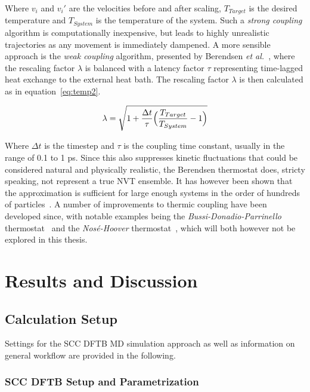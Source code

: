 \documentclass[11pt]{article}
\begin{document}
\bigskip

\noindent Where $v_i$ and $v_i'$ are the velocities before and after scaling, $T_{Target}$ is the desired temperature and $T_{System}$ is the temperature of the system. Such a \textit{strong coupling} algorithm is computationally inexpensive, but leads to highly unrealistic trajectories as any movement is immediately dampened. A more sensible approach is the \textit{weak coupling} algorithm, presented by Berendsen \textit{et al.}~\cite{Berendsen1984}, where the rescaling factor $\lambda$ is balanced with a latency factor $\tau$ representing time-lagged heat exchange to the external heat bath. The rescaling factor $\lambda$ is then calculated as in equation~\ref{eq:temp2}.

\begin{equation}
  \lambda = \sqrt{1 + \frac{\Delta t}{\tau}\Bigl(\frac{T_{Target}}{T_{System}} - 1\Bigr)}
  \label{eq:temp2}
\end{equation}

\bigskip

\noindent Where $\Delta t$ is the timestep and $\tau$ is the coupling time constant, usually in the range of 0.1 to 1 ps. Since this also suppresses kinetic fluctuations that could be considered natural and physically realistic, the Berendsen thermostat does, stricty speaking, not represent a true NVT ensemble. It has however been shown that the approximation is sufficient for large enough systems in the order of hundreds of particles~\cite{Morishita2000}. A number of improvements to thermic coupling have been developed since, with notable examples being the \textit{Bussi-Donadio-Parrinello} thermostat~\cite{Bussi2007} and the \textit{Nosé-Hoover} thermostat~\cite{Hoover1996}, which will both however not be explored in this thesis.

\section{Results and Discussion}
\subsection{Calculation Setup}
Settings for the SCC DFTB MD simulation approach as well as information on general workflow are provided in the following.

\subsubsection{SCC DFTB Setup and Parametrization}
\end{document}
